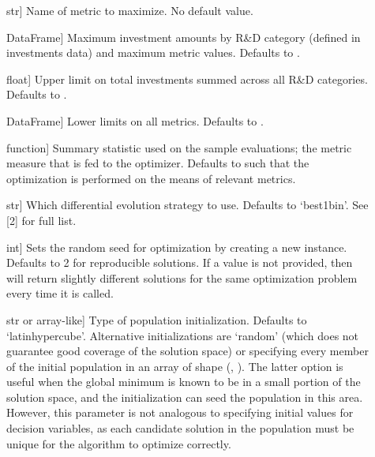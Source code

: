 \documentclass[letterpaper,10pt,english]{sphinxmanual}
\begin{document}
\begin{description}
\item[{}] \leavevmode{[}str{]}
Name of metric to maximize. No default value.

\item[{}] \leavevmode{[}DataFrame{]}
Maximum investment amounts by R\&D category (defined in investments
data) and maximum metric values. Defaults to .

\item[{}] \leavevmode{[}float{]}
Upper limit on total investments summed across all R\&D categories.
Defaults to .

\item[{}] \leavevmode{[}DataFrame{]}
Lower limits on all metrics. Defaults to .

\item[{}] \leavevmode{[}function{]}
Summary statistic used on the sample evaluations; the metric measure
that is fed to the optimizer. Defaults to  such that the
optimization is performed on the means of relevant metrics.

\item[{}] \leavevmode{[}str{]}
Which differential evolution strategy to use. Defaults to ‘best1bin’.
See {[}2{]} for full list.

\item[{}] \leavevmode{[}int{]}
Sets the random seed for optimization by creating a new
 instance. Defaults to 2 for reproducible solutions.
If a value is not provided, then  will
return slightly different solutions for the same optimization problem
every time it is called.

\item[{}] \leavevmode{[}str or array-like{]}
Type of population initialization. Defaults to ‘latinhypercube’.
Alternative initializations are ‘random’ (which does not guarantee
good coverage of the solution space) or specifying every member of
the initial population in an array of shape (,
). The latter option is useful when the global
minimum is known to be in a small portion of the solution space, and
the initialization can seed the population in this area. However,
this parameter is not analogous to specifying initial values for
decision variables, as each candidate solution in the population must
be unique for the algorithm to optimize correctly.


\end{description}
\end{document}
